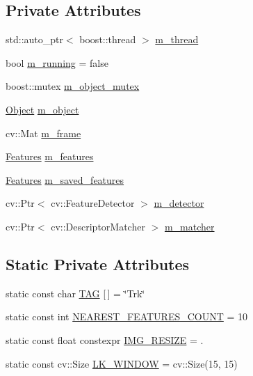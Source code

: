 \subsection*{Private Attributes}
\begin{DoxyCompactItemize}
\item 
std\-::auto\-\_\-ptr$<$ boost\-::thread $>$ \hyperlink{class_i_stuff_1_1_tracker_a76bb227e8681e75c9d7edd561e231ab6}{m\-\_\-thread}
\item 
bool \hyperlink{class_i_stuff_1_1_tracker_a6859d6a02fe907e0dcc1b48b79ba0d9d}{m\-\_\-running} = false
\item 
boost\-::mutex \hyperlink{class_i_stuff_1_1_tracker_a71c26a9c9d53b53cd3e6f46bfb9e1af1}{m\-\_\-object\-\_\-mutex}
\item 
\hyperlink{class_i_stuff_1_1_object}{Object} \hyperlink{class_i_stuff_1_1_tracker_a1d7215169ee7adb0bb9f182c0aaaa311}{m\-\_\-object}
\item 
cv\-::\-Mat \hyperlink{class_i_stuff_1_1_tracker_a174749550b4b79c8ddf91e9a744fb50d}{m\-\_\-frame}
\item 
\hyperlink{namespace_i_stuff_a2d680b8d3ea1fa53d1aa740cc669063c}{Features} \hyperlink{class_i_stuff_1_1_tracker_a2e8d6c6201c9ea3a4d824404c917befe}{m\-\_\-features}
\item 
\hyperlink{namespace_i_stuff_a2d680b8d3ea1fa53d1aa740cc669063c}{Features} \hyperlink{class_i_stuff_1_1_tracker_a72081a14f4eb1193fa9800a1e37e0100}{m\-\_\-saved\-\_\-features}
\item 
cv\-::\-Ptr$<$ cv\-::\-Feature\-Detector $>$ \hyperlink{class_i_stuff_1_1_tracker_a7efbebcf19f9308ae8b74232d809e47a}{m\-\_\-detector}
\item 
cv\-::\-Ptr$<$ cv\-::\-Descriptor\-Matcher $>$ \hyperlink{class_i_stuff_1_1_tracker_a126a9bea1a885a25b3fc734c96a052de}{m\-\_\-matcher}
\end{DoxyCompactItemize}
\subsection*{Static Private Attributes}
\begin{DoxyCompactItemize}
\item 
static const char \hyperlink{class_i_stuff_1_1_tracker_a68ef6bf09dbf9db7a6788ed899edb28d}{T\-A\-G} \mbox{[}$\,$\mbox{]} = \char`\"{}Trk\char`\"{}
\item 
static const int \hyperlink{class_i_stuff_1_1_tracker_a7bd424308b6879e92434378e653c8bdc}{N\-E\-A\-R\-E\-S\-T\-\_\-\-F\-E\-A\-T\-U\-R\-E\-S\-\_\-\-C\-O\-U\-N\-T} = 10
\item 
static const float constexpr \hyperlink{class_i_stuff_1_1_tracker_af0b19050495dbda2d14bdba30fd4eb9a}{I\-M\-G\-\_\-\-R\-E\-S\-I\-Z\-E} = .
\item 
static const cv\-::\-Size \hyperlink{class_i_stuff_1_1_tracker_af8521ba1a18dab69b2ff367799fc2101}{L\-K\-\_\-\-W\-I\-N\-D\-O\-W} = cv\-::\-Size(15, 15)
\end{DoxyCompactItemize}


